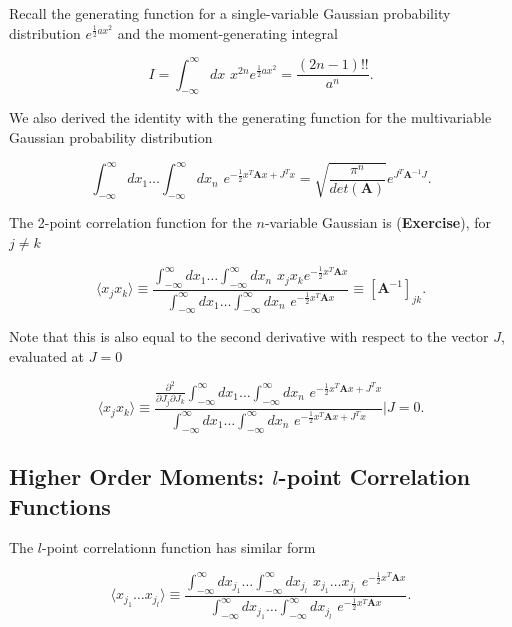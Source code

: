 
\noindent Recall the generating function for a single-variable Gaussian probability distribution $e^{\frac{1}{2} a x^2}$ and the moment-generating integral

\begin{equation}
I = \int_{-\infty}^\infty dx \,\, x^{2n} e^{\frac{1}{2} a x^2} = \frac{(2n-1)!!}{a^n}.
\end{equation}

\noindent We also derived the identity with the generating function for the multivariable Gaussian probability distribution

\begin{equation}
\int_{-\infty}^\infty dx_1 \dots \int_{-\infty}^\infty dx_n \,\, e^{-\frac{1}{2} x^T \textbf{A} x + J^T x} = \sqrt{\frac{\pi^n}{det(\textbf{A})}} e^{J^T \textbf{A}^{-1} J}.
\end{equation}

\noindent The 2-point correlation function for the $n$-variable Gaussian is (\textbf{Exercise}), for $j \ne k$

\begin{equation}
\langle x_j x_k \rangle \equiv \frac{\int_{-\infty}^\infty dx_1 \dots \int_{-\infty}^\infty dx_n \,\, x_j x_k e^{-\frac{1}{2} x^T \textbf{A} x}}{\int_{-\infty}^\infty dx_1 \dots \int_{-\infty}^\infty dx_n \,\, e^{-\frac{1}{2} x^T \textbf{A} x}} \equiv[\textbf{A}^{-1}]_{jk}.
\end{equation}

\noindent Note that this is also equal to the second derivative with respect to the vector $J$, evaluated at $J=0$

\begin{equation}
\langle x_j x_k \rangle \equiv \frac{\frac{\partial^2}{\partial J_j \partial J_k}\int_{-\infty}^\infty dx_1 \dots \int_{-\infty}^\infty dx_n \,\, e^{-\frac{1}{2} x^T \textbf{A} x + J^T x} }{\int_{-\infty}^\infty dx_1 \dots \int_{-\infty}^\infty dx_n \,\, e^{-\frac{1}{2} x^T \textbf{A} x + J^T x}} \Big|{J=0}.
\end{equation}

\subsection*{Higher Order Moments: $l$-point Correlation Functions}

\noindent The $l$-point correlationn function has similar form

\begin{equation}
\langle x_{j_1} \dots x_{j_l} \rangle \equiv \frac{\int_{-\infty}^\infty dx_{j_1} \dots \int_{-\infty}^\infty dx_{j_l} \,\, x_{j_1} \dots x_{j_l} \,\, e^{-\frac{1}{2} x^T \textbf{A} x}}{\int_{-\infty}^\infty dx_{j_1} \dots \int_{-\infty}^\infty dx_{j_l} \,\, e^{-\frac{1}{2} x^T \textbf{A} x}}.
\end{equation}

